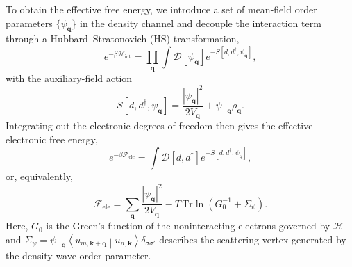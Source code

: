 \documentclass[aps,prx,article,twocolumn,amsmath,amssymb,superscriptaddress,longbibliography]{revtex4-2}
\begin{document}
To obtain the effective free energy, we introduce a set of mean-field order parameters $\{\psi_{\mathbf q}\}$ in the density channel and decouple the interaction term through a Hubbard--Stratonovich (HS) transformation,
\begin{equation}
e^{-\beta \mathcal{H}_{\mathrm{int}}}=\prod_{\mathbf q}\int\mathcal D[\psi_{\mathbf q}]e^{-S[d,d^\dagger,\psi_{\mathbf q}]} ,
\end{equation}
with the auxiliary-field action
\begin{equation}\label{eq:appHSField}
S[d,d^\dagger,\psi_{\mathbf q}]=\frac{|\psi_{\mathbf q}|^2}{2V_{\mathbf q}}+\psi_{-\mathbf q}\rho_{\mathbf q}.
\end{equation} 
Integrating out the electronic degrees of freedom then gives the effective electronic free energy,
\begin{equation}\label{eq:effAction}
e^{-\beta \mathcal{F}_{\mathrm{ele}}}=\int \mathcal D[d,d^\dagger]e^{-S[d,d^\dagger,\psi_{\mathbf q}]} ,
\end{equation}
or, equivalently,
\begin{equation}\label{eq:effFreeEnergy}
\mathcal F_{\mathrm{ele}}=\sum_{\mathbf q}\frac{|\psi_{\mathbf q}|^2}{2V_{\mathbf q}}-T\,\mathrm{Tr}\ln\left(G_0^{-1}+\Sigma_\psi\right).
\end{equation}
Here, $G_0$ is the Green's function of the noninteracting electrons governed by $\mathcal{H}$ and $\Sigma_\psi=\psi_{-\mathbf q}\left\langle u_{m,\mathbf k+\mathbf q}\middle|u_{n,\mathbf k}\right\rangle \delta_{\sigma\sigma'}$ describes the scattering vertex generated by the density-wave order parameter.
\end{document}
